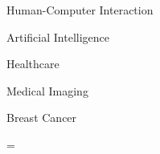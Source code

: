 \documentclass[a4paper,fleqn]{cas-sc}
\begin{document}
\begin{keywords}

Human-Computer Interaction

Artificial Intelligence

Healthcare

Medical Imaging

Breast Cancer

\end{keywords}

\maketitle




\printcredits

\clearpage





\clearpage

\appendix
\pdfpageheight=\pagetotal
{}

\end{document}
